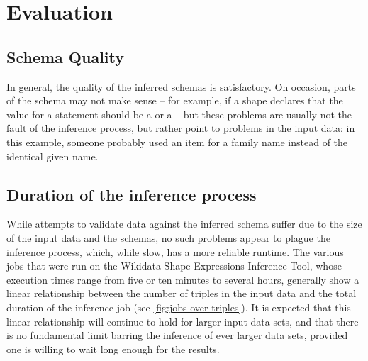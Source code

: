 
\chapter{Evaluation}
\label{ch:Evaluation}

\section{Schema Quality}
\label{sec:Evaluation:quality}

In general, the quality of the inferred schemas is satisfactory.
On occasion, parts of the schema may not make sense –
for example, if a shape declares that the value for a  statement
should be a  or a  –
but these problems are usually not the fault of the inference process,
but rather point to problems in the input data:
in this example, someone probably used an item for a family name
instead of the identical given name. %

\section{Duration of the inference process}
\label{sec:Evaluation:duration}

While attempts to validate data against the inferred schema
suffer due to the size of the input data and the schemas,
no such problems appear to plague the inference process,
which, while slow, has a more reliable runtime.
The various jobs that were run on the Wikidata Shape Expressions Inference Tool,
whose execution times range from five or ten minutes to several hours,
generally show a linear relationship between the number of triples in the input data
and the total duration of the inference job
(see \cref{fig:jobs-over-triples}).
It is expected that this linear relationship will continue to hold for larger input data sets,
and that there is no fundamental limit barring the inference of ever larger data sets,
provided one is willing to wait long enough for the results.

